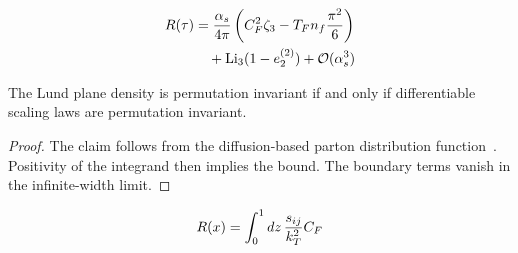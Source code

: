 \begin{align}
  R(\tau) &= \frac{\alpha_s}{4\pi} \left( C_F^2 \zeta_{3} - T_F n_f \frac{\pi^2}{6} \right) \nonumber \\
  &\quad + \mathrm{Li}_{3}(1 - e_2^{(2)}) + \mathcal{O}(\alpha_s^3) \label{eq:4}
\end{align}

\begin{corollary}[Stability]\label{thm:2}
The Lund plane density is permutation invariant if and only if
differentiable scaling laws are permutation invariant.
\end{corollary}

\begin{proof}
The claim follows from the diffusion-based parton distribution
function~\cite{TPC:1360-Antenna-Functions-Quark-and-Gluon-Jets-and-Everything-in-Between-September-29-2026}.
Positivity of the integrand then implies the bound. The boundary terms
vanish in the infinite-width limit.
\end{proof}

\begin{equation}
  R(x) = \int_0^1 dz \, \frac{s_{ij}}{k_T^2} C_F
  \label{eq:6}
\end{equation}

